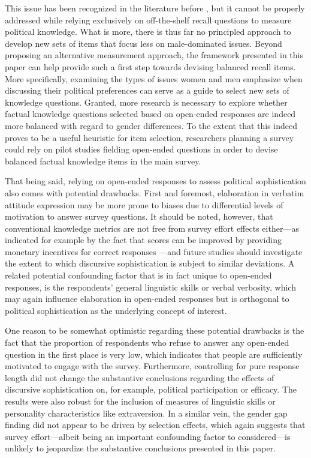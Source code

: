 This issue has been recognized in the literature before \citep[e.g.,][]{graber2001processing,dolan2011women}, but it cannot be properly addressed while relying exclusively on off-the-shelf recall questions to measure political knowledge. What is more, there is thus far no principled approach to develop new sets of items that focus less on male-dominated issues. Beyond proposing an alternative measurement approach, the framework presented in this paper can help provide such a first step towards devising balanced recall items. More specifically, examining the types of issues women and men emphasize when discussing their political preferences can serve as a guide to select new sets of knowledge questions. Granted, more research is necessary to explore whether factual knowledge questions selected based on open-ended responses are indeed more balanced with regard to gender differences. To the extent that this indeed proves to be a useful heuristic for item selection, researchers planning a survey could rely on pilot studies fielding open-ended questions in order to devise balanced factual knowledge items in the main survey.

That being said, relying on open-ended responses to assess political sophistication also comes with potential drawbacks. First and foremost, elaboration in verbatim attitude expression may be more prone to biases due to differential levels of motivation to answer survey questions. It should be noted, however, that conventional knowledge metrics are not free from survey effort effects either---as indicated for example by the fact that scores can be improved by providing monetary incentives for correct responses \citep{prior2008money}---and future studies should investigate the extent to which discursive sophistication is subject to similar deviations. A related potential confounding factor that is in fact unique to open-ended responses, is the respondents' general linguistic skills or verbal verbosity, which may again influence elaboration in open-ended responses but is orthogonal to political sophistication as the underlying concept of interest.

One reason to be somewhat optimistic regarding these potential drawbacks is the fact that the proportion of respondents who refuse to answer any open-ended question in the first place is very low, which indicates that people are sufficiently motivated to engage with the survey. Furthermore, controlling for pure response length did not change the substantive conclusions regarding the effects of discursive sophistication on, for example, political participation or efficacy. The results were also robust for the inclusion of measures of linguistic skills or personality characteristics like extraversion. In a similar vein, the gender gap finding did not appear to be driven by selection effects, which again suggests that survey effort---albeit being an important confounding factor to considered---is unlikely to jeopardize the substantive conclusions presented in this paper.

